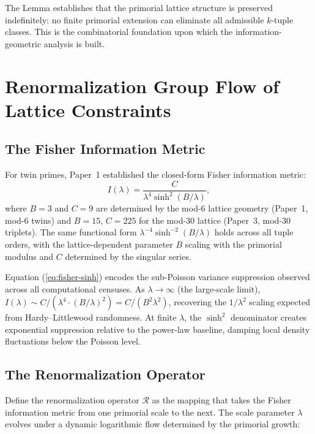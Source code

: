 \documentclass[11pt]{article}
\theoremstyle{remark}
\begin{document}
The Lemma establishes that the primorial lattice structure is preserved
indefinitely: no finite primorial extension can eliminate all admissible
$k$-tuple classes. This is the combinatorial foundation upon which the
information-geometric analysis is built.

\section{Renormalization Group Flow of Lattice Constraints}

\subsection{The Fisher Information Metric}

For twin primes, Paper~1 established the closed-form Fisher information
metric:
\begin{equation}
I(\lambda) = \frac{C}{\lambda^4 \sinh^2(B/\lambda)},
\label{eq:fisher-sinh}
\end{equation}
where $B = 3$ and $C = 9$ are determined by the mod-6 lattice
geometry (Paper~1, mod-6 twins) and $B = 15$, $C = 225$ for the
mod-30 lattice (Paper~3, mod-30 triplets). The same functional form
$\lambda^{-4} \sinh^{-2}(B/\lambda)$ holds across all tuple orders,
with the lattice-dependent parameter $B$ scaling with the primorial
modulus and $C$ determined by the singular series.

Equation (\ref{eq:fisher-sinh}) encodes the sub-Poisson variance
suppression observed across all computational censuses. As $\lambda \to
\infty$ (the large-scale limit), $I(\lambda) \sim C/(\lambda^4 \cdot
(B/\lambda)^2) = C/(B^2 \lambda^2)$, recovering the $1/\lambda^2$
scaling expected from Hardy--Littlewood randomness. At finite $\lambda$,
the $\sinh^2$ denominator creates exponential suppression relative to
the power-law baseline, damping local density fluctuations below the
Poisson level.

\subsection{The Renormalization Operator}

Define the renormalization operator $\mathcal{R}$ as the mapping that
takes the Fisher information metric from one primorial scale to the next.
The scale parameter $\lambda$ evolves under a dynamic logarithmic flow
determined by the primorial growth:
\end{document}
